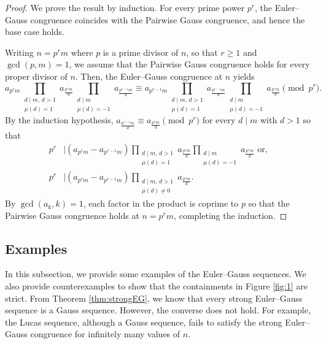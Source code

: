 \documentclass{article}
\numberwithin{equation}{section}
\theoremstyle{definition}
\begin{document}
\begin{proof}
    We prove the result by induction. For every prime power $p^r$, the Euler--Gauss congruence coincides with the Pairwise Gauss congruence, and hence the base case holds.

    Writing $n=p^r m$ where $p$ is a prime divisor of $n$, so that $r\geq1$ and $\gcd(p,m)=1$, we assume that the Pairwise Gauss congruence holds for every proper divisor of $n$. Then, the Euler--Gauss congruence at $n$ yields
    \[ a_{p^rm}\prod_{\substack{d\mid m,\,d>1\\\mu(d)=1}}
        a_\frac{p^rm}{d}
        \prod_{\substack{d\mid m\\\mu(d)=-1}}
        a_\frac{p^{r-1}m}{d}
        \equiv a_{p^{r-1}m}\prod_{\substack{d\mid m,\,d>1\\\mu(d)=1}}
        a_\frac{p^{r-1}m}{d}
        \prod_{\substack{d\mid m\\\mu(d)=-1}}
        a_\frac{p^rm}{d}\pmod{p^r}.
    \]
    By the induction hypothesis, $a_{\frac{p^{r-1}m}{d}}\equiv a_{\frac{p^rm}{d}}\pmod{p^r}$ for every $d\mid m$ with $d>1$ so that
    \begin{align*}
        p^r&\mid
        (a_{p^rm}-a_{p^{r-1}m})
        \prod_{\substack{d\mid m,\,d>1\\\mu(d)=1}}
        a_\frac{p^rm}{d}
        \prod_{\substack{d\mid m\\\mu(d)=-1}}
        a_\frac{p^rm}{d}\text{ or, }\\
        p^r&\mid
        (a_{p^rm}-a_{p^{r-1}m})
        \prod_{\substack{d\mid m,\,d>1\\\mu(d)\neq0}}
        a_\frac{p^rm}{d}.
    \end{align*}
    By $\gcd(a_k,k)=1$, each factor in the product is coprime to $p$ so that the Pairwise Gauss congruence holds at $n=p^rm$, completing the induction. 
\end{proof}
\subsection{Examples} 

In this subsection, we provide some examples of the Euler--Gauss sequences. We also provide counterexamples to show that the containments in Figure \ref{fig:1} are strict. From Theorem \ref{thm:strongEG}, we know that every strong Euler--Gauss sequence is a Gauss sequence. However, the converse does not hold. For example, the Lucas sequence, although a Gauss sequence, fails to satisfy the strong Euler--Gauss congruence for infinitely many values of $n$.
\end{document}
